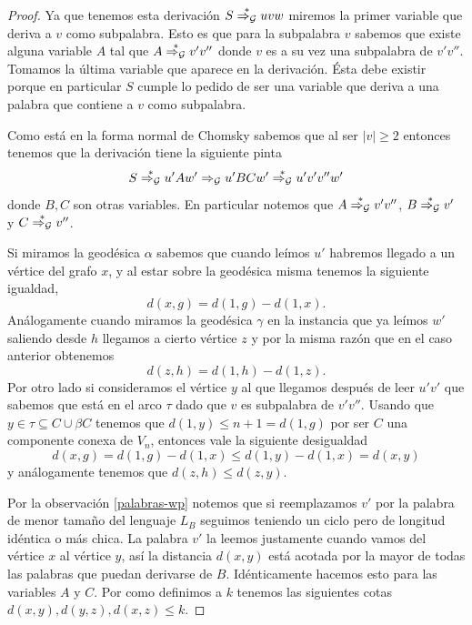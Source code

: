 \documentclass[tesis.tex]{subfiles}
\begin{document}
\begin{proof}
Ya que tenemos esta derivación $S \overset{*}{\Rightarrow_{\cal G}} uvw$ miremos la primer variable que deriva a $v$ como subpalabra. 
Esto es que para la subpalabra $v$ sabemos que existe alguna variable $A$ tal que $A \overset{*}{\Rightarrow_{\cal G}} v'v''$ donde $v$ es a su vez una subpalabra de $v'v''$. 
Tomamos la última variable que aparece en la derivación.
Ésta debe existir porque en particular $S$ cumple lo pedido de ser una variable que deriva a una palabra que contiene a $v$ como subpalabra.

Como está en la forma normal de Chomsky sabemos que al ser $|v| \ge 2$ entonces tenemos que la derivación tiene la siguiente pinta
\begin{equation*}
	S \overset{*}{\Rightarrow_{\cal G}} u'Aw' \Rightarrow_{\cal G} u'BC w' \overset{*}{\Rightarrow_{\cal G}} u'v'v''w'
\end{equation*}
donde $B,C$ son otras variables. En particular notemos que $A \overset{*}{\Rightarrow_{\cal G}} v'v''$, $B \overset{*}{\Rightarrow_{\cal G}} v'$ y $C \overset{*}{\Rightarrow_{\cal G}} v''$.


Si miramos la geodésica $\alpha$ sabemos que cuando leímos $u'$ habremos llegado a un vértice del grafo $x$, y al estar sobre la geodésica misma tenemos la siguiente igualdad,
\begin{equation*}
d(x,g) = d(1,g) - d(1,x).
\end{equation*}
Análogamente cuando miramos la geodésica $\gamma$ en la instancia que ya leímos $w'$ saliendo desde $h$ llegamos a cierto vértice $z$ y por la misma razón que en el caso anterior obtenemos
\begin{equation*}
	d(z,h) = d(1,h) - d(1,z).
\end{equation*}
Por otro lado si consideramos el vértice $y$ al que llegamos después de leer $u'v'$ que sabemos que está en el arco $\tau$ dado que $v$ es subpalabra de $v'v''$.
Usando que $y \in \tau \subseteq C \cup \beta C$ tenemos que $d(1,y) \le n+1 = d(1,g)$ por ser $C$ una componente conexa de $V_n$, entonces vale la siguiente desigualdad
\begin{equation*}
d(x,g) = d(1,g) - d(1,x) \le d(1,y) - d(1,x) = d(x,y)
\end{equation*}
y análogamente tenemos que $d(z,h) \le d(z,y)$.


Por la observación \ref{palabras-wp} notemos que si reemplazamos $v'$ por la palabra de menor tamaño del lenguaje $L_B$ seguimos teniendo un ciclo pero de longitud idéntica o más chica. 
La palabra $v'$ la leemos justamente cuando vamos del vértice $x$ al vértice $y$, así la distancia  $d(x,y)$ está acotada por la mayor de todas las palabras que puedan derivarse de $B$. 
Idénticamente hacemos esto para las variables $A$ y $C$.
Por como definimos a $k$ tenemos las siguientes cotas $d(x,y), d(y,z), d(x,z) \le k$.


\end{proof}
\end{document}
